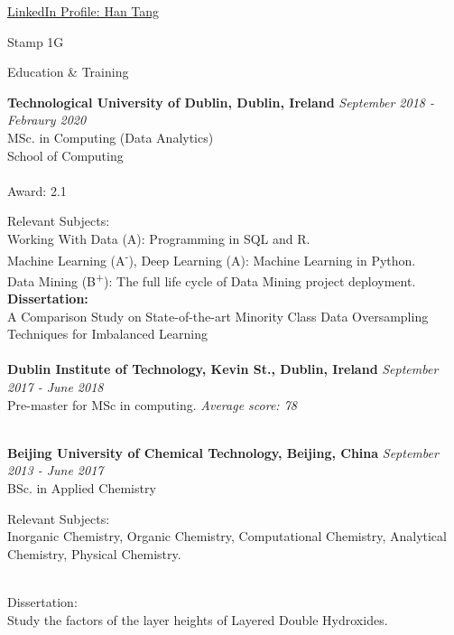 \documentclass{resume} %
\begin{document}
\centerline{\href{http://www.linkedin.com/in/han-tang-308a4117a}{LinkedIn Profile: Han Tang}}
\centerline{Stamp 1G}



\begin{rSection}{Education & Training}

{\bf Technological University of Dublin, Dublin, Ireland} \hfill {\em September 2018 - Febraury 2020} 
\\ MSc. in Computing (Data Analytics)
\\ School of Computing\\
\\Award: 2.1

Relevant Subjects: 
\\Working With Data (A): Programming in SQL and R.
\\Machine Learning (A\textsuperscript{-}),  Deep Learning (A): Machine Learning in Python.
\\Data Mining (B\textsuperscript{+}): The full life cycle of Data Mining project deployment.
\\ {\bf Dissertation:}
\\A Comparison Study on State-of-the-art Minority Class Data Oversampling Techniques for Imbalanced Learning
\\

\\{\bf Dublin Institute of Technology, Kevin St., Dublin, Ireland} \hfill {\em September 2017 - June 2018} 
\\ Pre-master for MSc in computing. \hfill {\em Average score: 78}


\\{\bf Beijing University of Chemical Technology, Beijing, China} \hfill {\em September 2013 - June 2017} 
\\ BSc. in Applied Chemistry

Relevant Subjects:
\\Inorganic Chemistry, Organic Chemistry, Computational Chemistry, Analytical Chemistry, Physical Chemistry.

\\Dissertation:
\\Study the factors of the layer heights of Layered Double Hydroxides.
\end{rSection}
\end{document}
